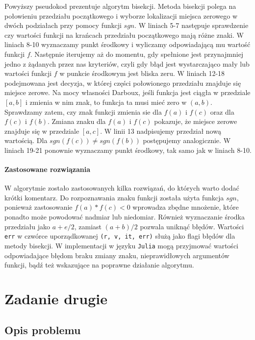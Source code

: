 \documentclass[a4paper]{article}
\begin{document}
Powyższy pseudokod prezentuje algorytm bisekcji. Metoda bisekcji polega na połowieniu przedziału początkowego i wyborze lokalizacji miejsca zerowego w dwóch podziałach przy pomocy funkcji $sgn$. W liniach 5-7 następuje sprawdzenie czy wartości funkcji na krańcach przedziału początkowego mają różne znaki. W liniach 8-10 wyznaczamy punkt środkowy i wyliczamy odpowiadającą mu wartość funkcji $f$. Następnie iterujemy aż do momentu, gdy spełnione jest przynajmniej jedno z żądanych przez nas kryteriów, czyli gdy błąd jest wystarczająco mały lub wartości funkcji $f$ w punkcie środkowym jest bliska zeru. W liniach 12-18 podejmowana jest decyzja, w której części połowionego przedziału znajduje się miejsce zerowe. Na mocy własności Darboux, jeśli funkcja jest ciągła w przedziale $[a, b]$ i zmienia w nim znak, to funkcja ta musi mieć zero w $(a, b)$. Sprawdzamy zatem, czy znak funkcji zmienia sie dla $f(a)$ i $f(c)$ oraz dla $f(c)$ i $f(b)$. Zmiana znaku dla $f(a)$ i $f(c)$ pokazuje, że miejsce zerowe znajduje się w przedziale $[a, c]$. W linii 13 nadpisujemy przedział nową wartością. Dla $sgn(f(c)) \neq sgn(f(b))$ postępujemy analogicznie. W liniach 19-21 ponownie wyznaczamy punkt środkowy, tak samo jak w liniach 8-10.

\paragraph{Zastosowane rozwiązania}
W algorytmie zostało zastosowanych kilka rozwiązań, do których warto dodać krótki komentarz. Do rozpoznawania znaku funkcji została użyta funkcja $sgn$, ponieważ zastosowanie $f(a)*f(c) < 0$ wprowadza zbędne mnożenie, które ponadto może powodować nadmiar lub niedomiar. Również wyznaczanie środka przedziału jako $a + e/2$, zamiast $(a + b)/2$ pozwala uniknąć błędów. Wartości \texttt{err} w czwórce uporządkowanej \texttt{(r, v, it, err)} służą jako flagi błędów dla metody bisekcji. W implementacji w języku \texttt{Julia} mogą przyjmować wartości odpowiadające błędom braku zmiany znaku, nieprawidłowych argumentów funkcji, bądź też wskazujące na poprawne działanie algorytmu.

\section{Zadanie drugie}

\subsection{Opis problemu}
\end{document}
